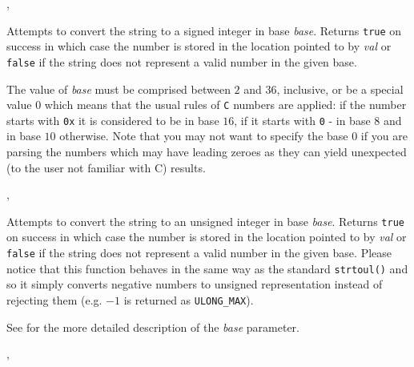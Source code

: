 ,\\

\label{wxstringtolong}


Attempts to convert the string to a signed integer in base {\it base}. Returns
{\tt true} on success in which case the number is stored in the location
pointed to by {\it val} or {\tt false} if the string does not represent a
valid number in the given base.

The value of {\it base} must be comprised between $2$ and $36$, inclusive, or
be a special value $0$ which means that the usual rules of {\tt C} numbers are
applied: if the number starts with {\tt 0x} it is considered to be in base
$16$, if it starts with {\tt 0} - in base $8$ and in base $10$ otherwise. Note
that you may not want to specify the base $0$ if you are parsing the numbers
which may have leading zeroes as they can yield unexpected (to the user not
familiar with C) results.


,\\

\label{wxstringtoulong}


Attempts to convert the string to an unsigned integer in base {\it base}.
Returns {\tt true} on success in which case the number is stored in the
location pointed to by {\it val} or {\tt false} if the string does not
represent a valid number in the given base. Please notice that this function
behaves in the same way as the standard \texttt{strtoul()} and so it simply
converts negative numbers to unsigned representation instead of rejecting them
(e.g. $-1$ is returned as \texttt{ULONG\_MAX}).

See  for the more detailed
description of the {\it base} parameter.


,\\

\label{wxstringtrim}

